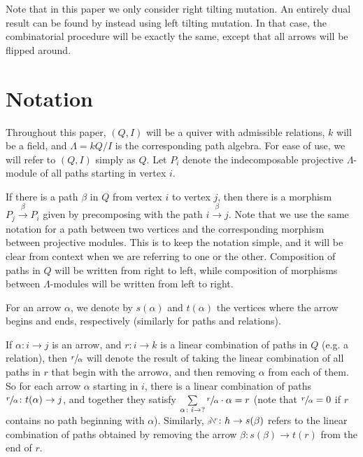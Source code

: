 \documentclass[12pt, dvipsnames, oneside]{amsart}
\theoremstyle{definition}
\newcommand{\bsfrac}[2]{\reflectbox{\sfrac{\text{\reflectbox{$#1$}}}{\text{\reflectbox{$#2$}}}}}
\begin{document}
Note that in this paper we only consider right tilting mutation. An entirely dual result can be found by instead using left tilting mutation.
In that case, the combinatorial procedure will be exactly the same, except that all arrows will be flipped around.

\smallskip

\section{Notation}\label{section:setup}

Throughout this paper, $(Q,I)$ will be a quiver with admissible relations, $k$ will be a field, and $\Lambda=kQ/I$ is the corresponding path algebra. For ease of use, we will refer to $(Q,I)$ simply as $Q$. Let $P_i$ denote the indecomposable projective $\Lambda$-module of all paths starting in vertex $i$. 

If there is a path $\beta$ in $Q$ from vertex $i$ to vertex $j$, then there is a morphism $P_j\xrightarrow{\beta} P_i$ given by precomposing with the path $i\xrightarrow{\beta} j$. 
Note that we use the same notation for a path between two vertices and the corresponding morphism between projective modules. This is to keep the notation simple, and it will be clear from context when we are referring to one or the other. Composition of paths in $Q$ will be written from right to left, while composition of morphisms between $\Lambda$-modules will be written from left to right.

For an arrow $\alpha$, we denote by $s(\alpha)$ and $t(\alpha)$ the vertices where the arrow begins and ends, respectively (similarly for paths and relations). 

If $\alpha\colon i\rightarrow j$ is an arrow, and $r\colon i \rightarrow k$ is a linear combination of paths in $Q$ (e.g. a relation), then $\sfrac{r}{\alpha}$ will denote the result of taking the linear combination of all paths in $r$ that begin with the arrow$ \alpha$, and then removing $\alpha$ from each of them. So for each arrow $\alpha$ starting in $i$, there is a linear combination of paths $\sfrac{r}{\alpha}\colon t(\alpha)\rightarrow j$, and together they satisfy $\sum\limits_{\alpha\colon i\rightarrow ?} \sfrac{r}{\alpha}\cdot\alpha = r$ (note that $\sfrac{r}{\alpha}=0$ if $r$ contains no path beginning with $\alpha$). Similarly, $\bsfrac{r}{\beta}\colon h\rightarrow s(\beta)$ refers to the linear combination of paths obtained by removing the arrow $\beta\colon s(\beta)\rightarrow t(r)$ from the end of $r$.
\end{document}
